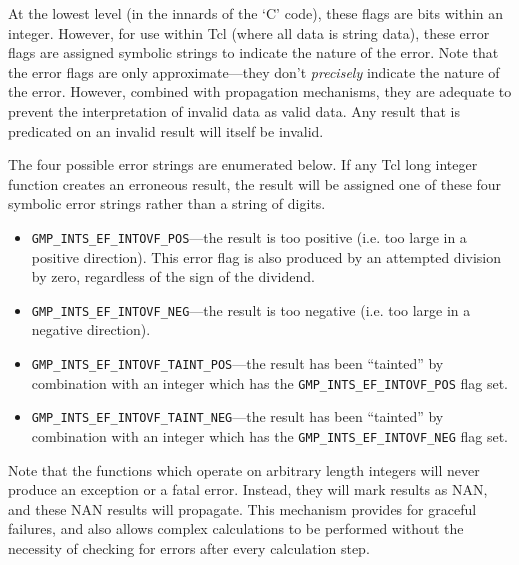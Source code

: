 At the lowest level (in the innards of the `C' code), these flags are
bits within an integer.  However, for use within Tcl (where all data is string data), these
error flags are assigned symbolic strings to indicate the nature of the error.  Note that the
error flags are only approximate---they don't \emph{precisely} indicate the
nature of the error.  However, combined with propagation mechanisms,
they are adequate to prevent the interpretation
of invalid data as valid data.  Any result that is predicated on an invalid
result will itself be invalid.

The four possible error strings are enumerated below.  If any Tcl long integer
function creates an erroneous result, the result will be assigned one of these
four symbolic error strings rather than a string of digits.

\begin{itemize}
\item {}
      \texttt{GMP\_INTS\_EF\_INTOVF\_POS}---the result is too positive (i.e. too
      large in a positive direction).  This error flag is also produced
	  by an attempted division by zero, regardless of the sign of the
	  dividend.
\item {}
      \texttt{GMP\_INTS\_EF\_INTOVF\_NEG}---the result is too negative (i.e. too
      large in a negative direction).
\item {}
      \texttt{GMP\_INTS\_EF\_INTOVF\_TAINT\_POS}---the result has been ``tainted''
      by combination with an integer which has the 
	  \texttt{GMP\_INTS\_EF\_INTOVF\_POS} flag set.
\item {}
      \texttt{GMP\_INTS\_EF\_INTOVF\_TAINT\_NEG}---the result has been
      ``tainted'' by combination with an integer which has the
	  \texttt{GMP\_INTS\_EF\_INTOVF\_NEG} flag set.
\end{itemize}

Note that the functions which operate on arbitrary length integers will
never produce an exception or a fatal error.  Instead, they will mark
results as NAN, and these NAN results will propagate.  
This mechanism provides for graceful failures, and also allows complex
calculations to be performed without the necessity of checking for
errors after every calculation step.

